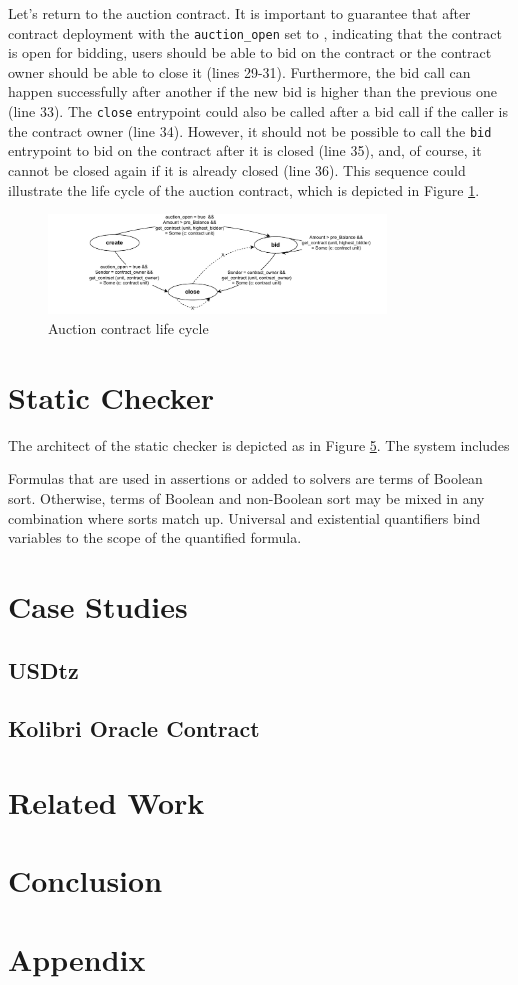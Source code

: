 \documentclass[a4paper,UKenglish,cleveref, autoref, thm-restate]{lipics-v2021}
\begin{document}
Let's return to the auction contract. It is important to guarantee that after contract deployment with the  \lstinline/auction_open/ set to \TRUE, indicating that the contract is open for bidding, users should be able to bid on the contract or the contract owner should be able to close it (lines 29-31). Furthermore, the bid call can happen successfully after another if the new bid is higher than the previous one (line 33). The  \lstinline/close/ entrypoint could also be called after a bid call if the caller is the contract owner (line 34). However, it should not be possible to call the  \lstinline/bid/ entrypoint to bid on the contract after it is closed (line 35), and, of course, it cannot be closed again if it is already closed (line 36). This sequence could illustrate the life cycle of the auction contract, which is depicted in Figure \ref{fig:auction-life-cycle}.

\begin{figure}[h]
    \centering
    \includegraphics[width=0.8\textwidth]{auction-life-cycle}
    \caption{Auction contract life cycle}
    \label{fig:auction-life-cycle}
\end{figure}

\section {Static Checker}
The architect of the static checker is depicted as in Figure \ref{}.  The system includes 

Formulas that are used in assertions or added to solvers are terms of Boolean sort. Otherwise, terms of Boolean and non-Boolean sort may be mixed in any combination where sorts match up. Universal and existential quantifiers bind variables to the scope of the quantified formula.
\section {Case Studies}
\subsection{USDtz}
\subsection{Kolibri Oracle Contract}
\section {Related Work}
\section {Conclusion}
\section {Appendix}
\end{document}

